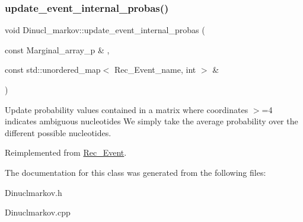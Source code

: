 \subsubsection{\texorpdfstring{update\+\_\+event\+\_\+internal\+\_\+probas()}{update\_event\_internal\_probas()}}
{\footnotesize\ttfamily void Dinucl\+\_\+markov\+::update\+\_\+event\+\_\+internal\+\_\+probas (\begin{DoxyParamCaption}\item[{const Marginal\+\_\+array\+\_\+p \&}]{,  }\item[{const std\+::unordered\+\_\+map$<$ Rec\+\_\+\+Event\+\_\+name, int $>$ \&}]{ }\end{DoxyParamCaption})\hspace{0.3cm}{\ttfamily [virtual]}}

Update probability values contained in a matrix where coordinates $>$=4 indicates ambiguous nucleotides We simply take the average probability over the different possible nucleotides. 

Reimplemented from \hyperlink{classRec__Event_a6b5b41f5d35969c61ba5fc90895203c3}{Rec\+\_\+\+Event}.



The documentation for this class was generated from the following files\+:\begin{DoxyCompactItemize}
\item 
Dinuclmarkov.\+h\item 
Dinuclmarkov.\+cpp\end{DoxyCompactItemize}

